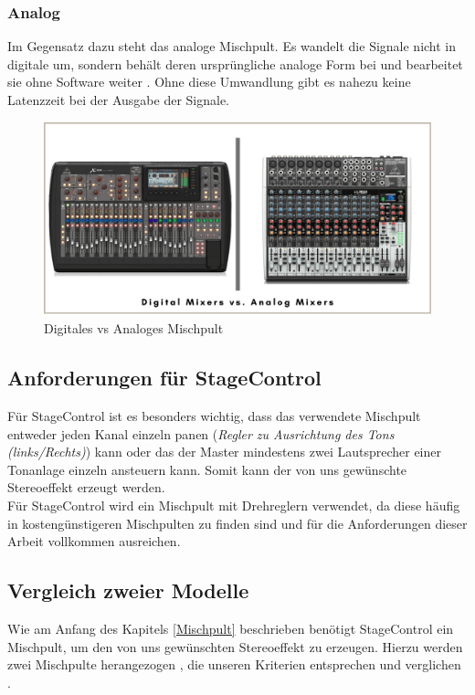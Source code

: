 \subsubsection{Analog}
Im Gegensatz dazu steht das analoge Mischpult. Es wandelt die Signale nicht in digitale um, sondern behält deren ursprüngliche analoge Form bei und bearbeitet sie ohne Software weiter \parencite{MischpultAnalogDigital}. Ohne diese Umwandlung gibt es nahezu keine Latenzzeit bei der Ausgabe der Signale. \\


\begin{figure}[H]
	\centering
	\includegraphics[width=0.8\linewidth]{images/DigitalMixerAnalogMixer.png}
	\caption[Digitales vs Analoges Mischpult]{Digitales vs Analoges Mischpult}
	\label{fig:Digitales vs. Analoges Mischpult}
\end{figure}


\subsection{Anforderungen für StageControl}
Für StageControl ist es besonders wichtig, dass das verwendete Mischpult entweder jeden Kanal einzeln panen (\textit{Regler zu Ausrichtung des Tons (links/Rechts)}) kann oder das der Master mindestens zwei Lautsprecher einer Tonanlage einzeln ansteuern kann. Somit kann der von uns gewünschte Stereoeffekt erzeugt werden. \\
Für StageControl wird ein Mischpult mit Drehreglern verwendet, da diese häufig in kostengünstigeren Mischpulten zu finden sind und für die Anforderungen dieser Arbeit vollkommen ausreichen. 



\subsection{Vergleich zweier Modelle}
Wie am Anfang des Kapitels \ref{Mischpult} beschrieben benötigt StageControl ein Mischpult, um den von uns gewünschten Stereoeffekt zu erzeugen. Hierzu werden zwei Mischpulte herangezogen \parencite{MischpultKriterien1204}, die unseren Kriterien entsprechen und  verglichen  \parencite{MischpultKriterien1402}.

